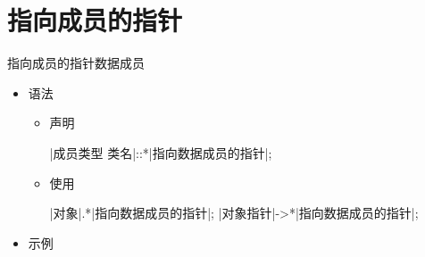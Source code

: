
\section[指向成员的指针]{指向成员的指针}
\begin{frame}[t, fragile]{指向成员的指针}{数据成员}%
  \begin{itemize}
  \item 语法
    \begin{itemize}
    \item 声明\\[-1ex]
      \begin{center}
        \begin{minipage}{0.8\linewidth}
          \begin{cpptt}
|成员类型 类名|::*|指向数据成员的指针|;
          \end{cpptt}
        \end{minipage}
      \end{center}  
    \item 使用\\[-1ex]
      \begin{center}
        \begin{minipage}{0.8\linewidth}
          \begin{cpptt}
|对象|.*|指向数据成员的指针|;
|对象指针|->*|指向数据成员的指针|;
          \end{cpptt}
        \end{minipage}
      \end{center}
    \end{itemize}    
  \item 示例\\
    \begin{center}
      \begin{minipage}{0.45\linewidth}
      \end{minipage}
      \begin{minipage}{0.45\linewidth}
      \end{minipage} 
    \end{center}
  \end{itemize}
\end{frame}
